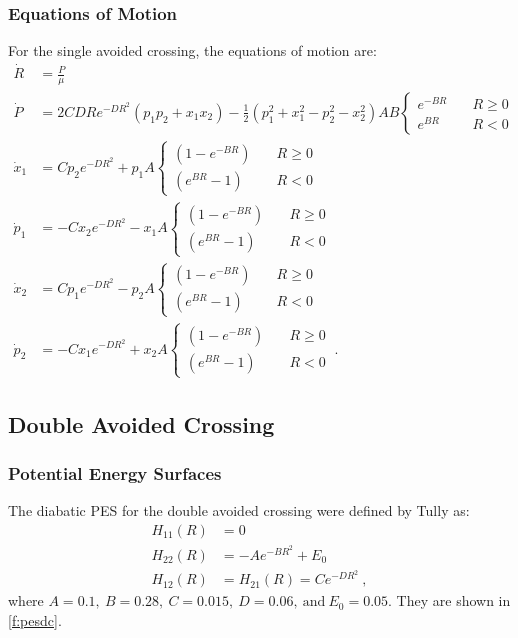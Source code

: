 \subsubsection{Equations of Motion}
%
For the single avoided crossing, the equations of motion are:
\begin{subequations}
\begin{align}
\dot{R} & = \frac{P}{\mu}\\
\dot{P} & = 2 C D R e^{-D R^2} (p_{1} p_{2}+ x_{1} x_{2})-\frac{1}{2} \left(p_{1}^{2} + x_{1}^{2} - p_{2}^{2} - x_{2}^{2}\right)
A B \begin{cases}
e^{-B R} &\quad R \geq 0\\
e^{B R} &\quad R < 0
\end{cases}\\
\dot{x}_{1} & = C p_2 e^{-D R^2}+p_1
A \begin{cases}
(1 - e^{-B R}) &\quad R \geq 0\\
(e^{B R} - 1) &\quad R < 0
\end{cases}\\
\dot{p}_{1} & = -C x_2 e^{-D R^2}-x_1
A \begin{cases}
(1 - e^{-B R}) &\quad R \geq 0\\
(e^{B R} - 1) &\quad R < 0
\end{cases}\\
\dot{x}_{2} & = C p_1 e^{-D R^2}-p_2
A \begin{cases}
(1 - e^{-B R}) &\quad R \geq 0\\
(e^{B R} - 1) &\quad R < 0
\end{cases}\\
\dot{p}_{2} & = -C x_1 e^{-D R^2} + x_2
A \begin{cases}
(1 - e^{-B R}) &\quad R \geq 0\\
(e^{B R} - 1) &\quad R < 0
\end{cases}~.
\end{align}
\end{subequations}
%
\subsection{Double Avoided Crossing}\label{s:dac}
%
\subsubsection{Potential Energy Surfaces}
%
The diabatic PES for the double avoided crossing were defined by Tully \cite{tully} as:
\begin{subequations}
\begin{align}
H_{11}(R) &= 0 \\
H_{22}(R) &= -A e^{-B R^{2}} + E_{0}\\
H_{12}(R) &= H_{21}(R) = C e^{-D R^{2}}~,
\end{align}
\end{subequations}
where $ A = 0.1,~B = 0.28,~C = 0.015,~D = 0.06,~\text{and}~E_{0} = 0.05$. They are shown in \cref{f:pesdc}.

